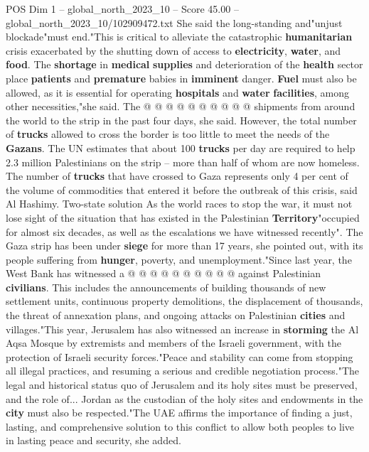 \begin{textsample}{POS Dim 1 – global\_north\_2023\_10 – Score 45.00 – global\_north\_2023\_10/102909472.txt}
She said the long-standing and"unjust blockade"must end."This is critical to alleviate the catastrophic \textbf{humanitarian} crisis exacerbated by the shutting down of access to \textbf{electricity}, \textbf{water}, and \textbf{food}.
The \textbf{shortage} in \textbf{medical} \textbf{supplies} and deterioration of the \textbf{health} sector place \textbf{patients} and \textbf{premature} babies in \textbf{imminent} danger. \textbf{Fuel} must also be allowed, as it is essential for operating \textbf{hospitals} and \textbf{water} \textbf{facilities}, among other necessities,"she said.
The @ @ @ @ @ @ @ @ @ @ shipments from around the world to the strip in the past four days, she said.
However, the total number of \textbf{trucks} allowed to cross the border is too little to meet the needs of the \textbf{Gazans}.
The UN estimates that about 100 \textbf{trucks} per day are required to help 2.3 million Palestinians on the strip -- more than half of whom are now homeless.
The number of \textbf{trucks} that have crossed to Gaza represents only 4 per cent of the volume of commodities that entered it before the outbreak of this crisis, said Al Hashimy.
Two-state solution As the world races to stop the war, it must not lose sight of the situation that has existed in the Palestinian \textbf{Territory}"occupied for almost six decades, as well as the escalations we have witnessed recently".
The Gaza strip has been under \textbf{siege} for more than 17 years, she pointed out, with its people suffering from \textbf{hunger}, poverty, and unemployment."Since last year, the West Bank has witnessed a @ @ @ @ @ @ @ @ @ @ against Palestinian \textbf{civilians}.
This includes the announcements of building thousands of new settlement units, continuous property demolitions, the displacement of thousands, the threat of annexation plans, and ongoing attacks on Palestinian \textbf{cities} and villages."This year, Jerusalem has also witnessed an increase in \textbf{storming} the Al Aqsa Mosque by extremists and members of the Israeli government, with the protection of Israeli security forces."Peace and stability can come from stopping all illegal practices, and resuming a serious and credible negotiation process."The legal and historical status quo of Jerusalem and its holy sites must be preserved, and the role of...
Jordan as the custodian of the holy sites and endowments in the \textbf{city} must also be respected."The UAE affirms the importance of finding a just, lasting, and comprehensive solution to this conflict to allow both peoples to live in lasting peace and security, she added.

\end{textsample}
